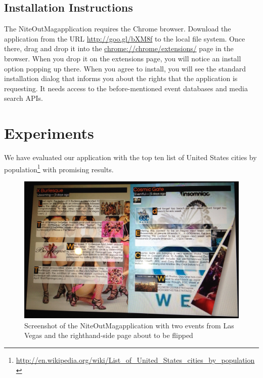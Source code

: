\documentclass{acm_proc_article-sp}
\begin{document}
{\subsection{Installation Instructions}
The NiteOutMag\texttrademark application requires the Chrome browser.
Download the application from the URL \url{http://goo.gl/bXM8f} to the local file system.
Once there, drag and drop it into the \url{chrome://chrome/extensions/} page in the browser.
When you drop it on the extensions page, you will notice an install option popping up there.
When you agree to install, you will see the standard installation dialog
that informs you about the rights that the application is requesting.
It needs access to the before-mentioned event databases and media search APIs.


\section{Experiments}                                                       \label{sec:experiments}
We have evaluated our application with the top ten list of
United States cities by
population\footnote{\url{http://en.wikipedia.org/wiki/List_of_United_States_cities_by_population}}
with promising results.

\begin{figure}[b!]
\centering
\includegraphics[width=1.0\columnwidth]{./screenshot.jpg}
\caption{Screenshot of the NiteOutMag\texttrademark application with two events from Las Vegas and the righthand-side page about to be flipped}
\label{fig:screenshot}
\end{figure}

}
\end{document}
